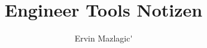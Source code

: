 \documentclass[a4paper,
               10pt,
               fleqn]{article}
\author{Ervin Mazlagic\'}
\title{Engineer Tools Notizen}
\begin{document}
\tableofcontents





\lstlistoflistings
\end{document}
